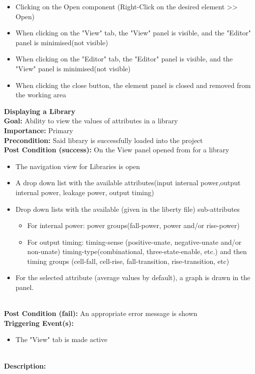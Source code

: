 \documentclass[10pt,a4paper]{report}
\newcommand{\precondition}[1]{
    \textbf{Precondition: } #1 \leavevmode \\
}
\newcommand{\FRDescription}[8]{
    \textbf{#1} \leavevmode \\
    \textbf{Goal: } #2 \leavevmode \\
    \textbf{Importance: } #3 \leavevmode \\
    \precondition{#4}
    \textbf{Post Condition (success): } #5 \leavevmode \\
    \textbf{Post Condition (fail): } #6 \leavevmode \\
    \textbf{Triggering Event(s): } #7 \leavevmode \\
    \textbf{Description: } \leavevmode \\ 
    #8}
\begin{document}
\begin{FR}
{\begin{itemize}
        \item Clicking on the Open component (Right-Click on the desired element >> Open)
    \end{itemize}}
    {\begin{itemize}
        \item When clicking on the "View" tab, the "View" panel is visible, and the "Editor" panel is minimised(not visible)
        \item When clicking on the "Editor" tab, the "Editor" panel is visible, and the "View" panel is minimised(not visible)
        \item When clicking the close button, the element panel is closed and removed from the working area 
    \end{itemize}}
    \item \FRDescription{Displaying a Library}
    {Ability to view the values of attributes in a library}
    {Primary}
    {Said library is successfully loaded into the project}
    {On the View panel opened from \label{FR-PREVIOUS} for a library
        \begin{itemize}
            \item The navigation view for Libraries is open
            \item A drop down list with the available attributes(input internal power,output internal power, leakage power, output timing)
            \item Drop down lists with the available (given in the liberty file) sub-attributes
            \begin{itemize}
                \item For internal power: power groups(fall-power, power and/or rise-power)
                \item For output timing: timing-sense (positive-unate, negative-unate and/or non-unate) timing-type(combinational, three-state-enable, etc.) and then timing groups (cell-fall, cell-rise, fall-transition, rise-transition, etc)
            \end{itemize}
            \item For the selected attribute (average values by default), a graph is drawn in the panel.
        \end{itemize}}
    {An appropriate error message is shown}
    {\begin{itemize}
        \item The "View" tab is made active
    \end{itemize}}
    {\begin{itemize}

\end{itemize}}
\end{FR}
\end{document}
